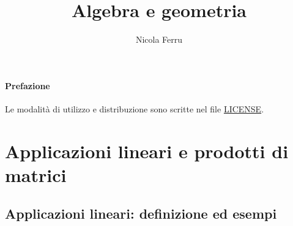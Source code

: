 \documentclass{book}
\title{Algebra e geometria}
\author{Nicola Ferru}
\theoremstyle{definition}
\theoremstyle{plain}
\begin{document}
\maketitle
\tableofcontents

\subsubsection{Prefazione}
\label{sec:pref}
Le modalità di utilizzo e distribuzione sono scritte nel file \href{https://github.com/NF02/Appunti-universita/blob/main/LICENSE}{LICENSE}.



\chapter{Applicazioni lineari e prodotti di matrici}
\label{chap:appLinEprodotdimatrix}

\section{Applicazioni lineari: definizione ed esempi}
\label{sec:applindefes}
\end{document}
